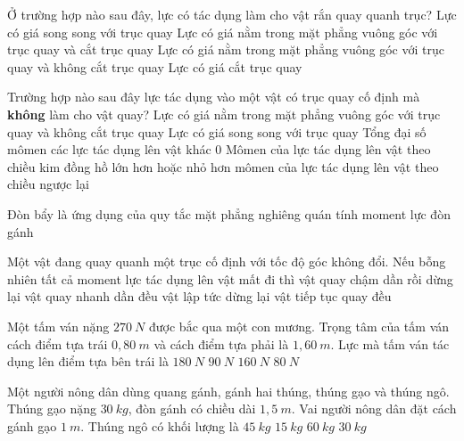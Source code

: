 \begin{ex}%
Ở trường hợp nào sau đây, lực có tác dụng làm cho vật rắn quay quanh trục? 
\choice
{Lực có giá song song với trục quay}
{Lực có giá nằm trong mặt phẳng vuông góc với trục quay và cắt trục quay}
{ \True Lực có giá nằm trong mặt phẳng vuông góc với trục quay và không cắt trục quay}
{Lực có giá cắt trục quay}
\end{ex}
\begin{ex}%
Trường hợp nào sau đây lực tác dụng vào một vật có trục quay cố định mà \textbf{không} làm cho vật quay? 
\choice
{Lực có giá nằm trong mặt phẳng vuông góc với trục quay và không cắt trục quay}
{\True Lực có giá song song với trục quay}
{Tổng đại số mômen các lực tác dụng lên vật khác 0}	
{Mômen của lực tác dụng lên vật theo chiều kim đồng hồ lớn hơn hoặc nhỏ hơn mômen của lực tác dụng lên vật theo chiều ngược lại}
\end{ex} 
\begin{ex}%
Đòn bẩy là ứng dụng của quy tắc
\choice
{mặt phẳng nghiêng}
{quán tính}
{\True moment lực}
{đòn gánh}
\loigiai{}
\end{ex}
\begin{ex}%
Một vật đang quay quanh một trục cố định với tốc độ góc không đổi. Nếu bỗng nhiên tất cả moment lực tác dụng lên vật mất đi thì
\choice
{vật quay chậm dần rồi dừng lại}
{vật quay nhanh dần đều}
{vật lập tức dừng lại}
{\True vật tiếp tục quay đều}
\loigiai{}
\end{ex}
\begin{ex}%
Một tấm ván nặng $270\ N$ được bắc qua một con mương. Trọng tâm của tấm ván cách điểm tựa trái $0,80 \ m$ và cách điểm tựa phải là $1,60 \ m$. Lực mà tấm ván tác dụng lên điểm tựa bên trái là
\choice
{\True $180 \ N$}
{$90\ N$}
{$160\ N$}
{$80\ N$}
\loigiai{}
\end{ex}
\begin{ex}%
Một người nông dân dùng quang gánh, gánh hai thúng, thúng gạo và thúng ngô. Thúng gạo nặng $30\ kg$, đòn gánh có chiều dài $1,5 \ m$. Vai người nông dân đặt cách gánh gạo $1\ m$. Thúng ngô có khối lượng là
\choice
{$45\ kg$}
{$15\ kg$}
{\True $60\ kg$}
{$30\ kg$}
\loigiai{}
\end{ex}
